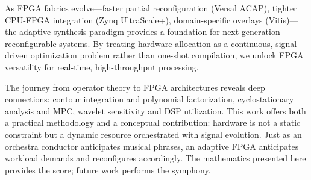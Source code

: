 As FPGA fabrics evolve—faster partial reconfiguration (Versal ACAP), tighter CPU-FPGA integration (Zynq UltraScale+), domain-specific overlays (Vitis)—the adaptive synthesis paradigm provides a foundation for next-generation reconfigurable systems. By treating hardware allocation as a continuous, signal-driven optimization problem rather than one-shot compilation, we unlock FPGA versatility for real-time, high-throughput processing.

The journey from operator theory to FPGA architectures reveals deep connections: contour integration and polynomial factorization, cyclostationary analysis and MPC, wavelet sensitivity and DSP utilization. This work offers both a practical methodology and a conceptual contribution: hardware is not a static constraint but a dynamic resource orchestrated with signal evolution. Just as an orchestra conductor anticipates musical phrases, an adaptive FPGA anticipates workload demands and reconfigures accordingly. The mathematics presented here provides the score; future work performs the symphony.
